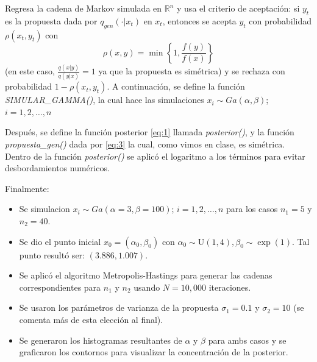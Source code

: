 Regresa la cadena de Markov simulada en $\mathbb{R}^n$ y usa el criterio de aceptación: si $y_t$ es la propuesta dada por $q_{gen}(\cdot|x_t)$ en $x_t$, entonces se acepta $y_t$ con probabilidad $\rho(x_t, y_t)$ con
\begin{equation}
	\rho(x,y) = \min\left\{1, \frac{f(y)}{f(x)} \right\}
\end{equation}
(en este caso, $\frac{q(x|y)}{q(y|x)} = 1$ ya que la propuesta es simétrica) y se rechaza con probabilidad $1-\rho(x_t, y_t)$. A continuación, se define la función \textit{SIMULAR\_GAMMA()}, la cual hace las simulaciones $x_i \sim G a(\alpha, \beta)$; $i=1,2, \ldots, n$

Después, se define la función posterior \eqref{eq:1} llamada \textit{posterior()}, y la función \textit{propuesta\_gen()} dada por \eqref{eq:3} la cual, como vimos en clase, es simétrica. Dentro de la función \textit{posterior()} se aplicó el logaritmo a los términos para evitar desbordamientos numéricos.

Finalmente:
\begin{itemize}
	\item Se simulacion $x_i \sim G a(\alpha = 3, \beta=100)$; $i=1,2, \ldots, n$ para los casos $n_{1}=5$ y $n_{2}=40$.
	\item Se dio el punto inicial $x_0=(\alpha_0, \beta_0)$ con $\alpha_0 \sim \mathrm{U}(1,4), \beta_0 \sim \exp (1)$. Tal punto resultó ser: $(3.886, 1.007)$.
	\item Se aplicó el algoritmo Metropolis-Hastings para generar las cadenas correspondientes para $n_1$ y $n_2$ usando $N=10,000$ iteraciones.
	\item Se usaron los parámetros de varianza de la propuesta $\sigma_1=0.1$ y $\sigma_2=10$ (se comenta más de esta elección al final).
	\item Se generaron los histogramas resultantes de $\alpha$ y $\beta$ para ambs casos y se graficaron los contornos para visualizar la concentración de la posterior.
\end{itemize}

